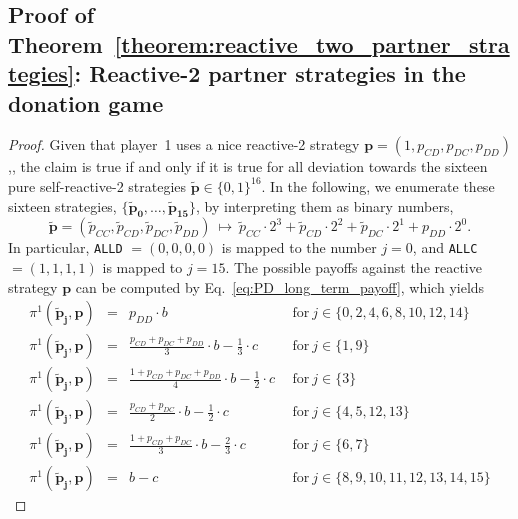\documentclass[11pt]{article}
\theoremstyle{plainCl1}
\theoremstyle{plainCl2}
\def\allc{\texttt{ALLC}}
\def\alld{\texttt{ALLD}}
\begin{document}
\subsection{Proof of Theorem~\ref{theorem:reactive_two_partner_strategies}: Reactive-2 partner strategies in the donation game}
\begin{proof}
Given that player~1 uses a nice reactive-2 strategy $\mathbf{p} = (1, p_{CD},p_{DC}, p_{DD})$,, the claim is true if and only if it is true for all deviation towards the sixteen pure self-reactive-2 strategies $\mathbf{\tilde{p}}\!\in\!\{0,1\}^{16}$. 
In the following, we enumerate these sixteen strategies, $\{\mathbf{\tilde{p}_0}, \dots, \mathbf{\tilde{p}_{15}}\}$, 
by interpreting them as binary numbers, 
\begin{equation}
\mathbf{\tilde p} = (\tilde p_{CC}, \tilde p_{CD},\tilde p_{DC},\tilde p_{DD}) ~\mapsto~
\tilde p_{CC} \!\cdot\! 2^3 + \tilde p_{CD} \!\cdot\! 2^2 + \tilde p_{DC} \!\cdot\! 2^1 + p_{DD}\cdot 2^0. 
\end{equation}
In particular, \alld{} $=\!(0,0,0,0)$ is mapped to the number $j\!=\!0$, and \allc{} $=\!(1,1,1,1)$ is mapped to $j\!=\!15$. 
The possible payoffs against the reactive strategy $\mathbf{p}$ can be computed by Eq.~\eqref{eq:PD_long_term_payoff}, which yields
\begin{equation*}\label{Eq:PayoffExpressionsReactiveTwo}
  \begin{array}{lcll}
   \pi^1(\mathbf{\tilde p_j},\mathbf{p}) &= &\displaystyle p_{DD}\cdot b & ~~\text{for}~ j\! \in\!  \{0, 2, 4, 6, 8, 10, 12, 14\} \\[0.3cm]
   \pi^1(\mathbf{\tilde p_j},\mathbf{p}) &= &\displaystyle  \frac{p_{CD} + p_{DC} + p_{DD}}{3}\cdot b - \frac{1}{3} \cdot c  & ~~\text{for}~ j\! \in\!  \{1, 9\} \\[0.3cm]
   \pi^1(\mathbf{\tilde p_j},\mathbf{p}) &= &\displaystyle  \frac{1+p_{CD} + p_{DC} + p_{DD} }{4}\cdot b - \frac{1}{2} \cdot c  & ~~\text{for}~ j\! \in\!  \{3\} \\[0.3cm]
   \pi^1(\mathbf{\tilde p_j},\mathbf{p}) &= &\displaystyle  \frac{p_{CD} + p_{DC}}{2}\cdot b - \frac{1}{2} \cdot c  & ~~\text{for}~ j\! \in\!  \{4, 5, 12, 13\} \\[0.3cm]
   \pi^1(\mathbf{\tilde p_j},\mathbf{p}) &= &\displaystyle  \frac{1+p_{CD} + p_{DC}}{3}\cdot b - \frac{2}{3} \cdot c  & ~~\text{for}~ j\! \in\!  \{6, 7\}\\[0.3cm]
   \pi^1(\mathbf{\tilde p_j},\mathbf{p}) &= &\displaystyle  b - c & ~~\text{for}~ j\! \in\!  \{8, 9, 10, 11, 12, 13, 14, 15\}

\end{array}
\end{equation*}
\end{proof}
\end{document}
